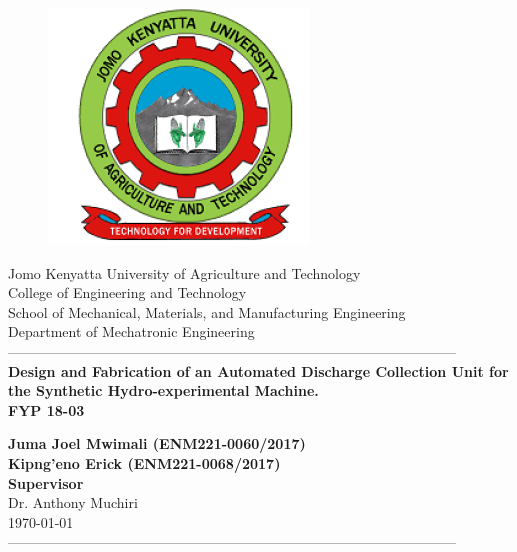 \documentclass[12pt,fleqn]{article}
\newcommand{\yesthreeday}{{\AdvanceDate[-4]\today}}
\begin{document}
\begin{titlepage}
  \begin{center}
      \vspace*{-4.0cm}
    \begin{figure}[!h]
\centering
\includegraphics[width=0.3\linewidth]{Figures/JKUAT_logo}
\label{fig:jomologo}
\end{figure}
   \large{Jomo Kenyatta University of Agriculture and Technology}\\
    \large{College of Engineering and Technology}\\
    \large{School of Mechanical, Materials, and Manufacturing Engineering}\\
   \large{Department of Mechatronic Engineering}\\

    ------------------------------------------------------------------------------------------------\\[1.0cm]
    \LARGE{\textbf{Design and Fabrication of an Automated Discharge Collection Unit for the Synthetic Hydro-experimental Machine.}}\\[0.6cm]
    
    \LARGE{\textbf{FYP 18-03}}\\[1.5cm]

    \vspace{0.5cm}
    
    \large{\textbf{Juma Joel Mwimali (ENM221-0060/2017)
            }}\\
     \large{\textbf{Kipng'eno Erick (ENM221-0068/2017)
            }}\\[1.0cm]
     \large{\textbf{Supervisor}}\\
	\large{Dr. Anthony Muchiri}\\
    \large{\small{\yesthreeday}}\\
    ------------------------------------------------------------------------------------------------\\[1.5cm]
  \end{center}
\end{titlepage}
\end{document}
